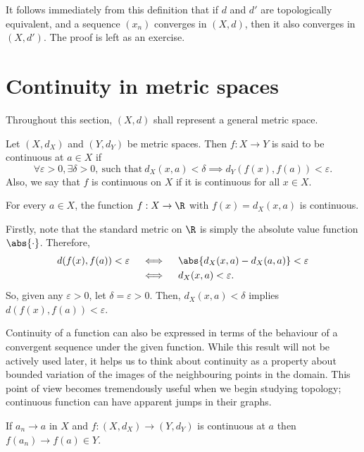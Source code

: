 \documentclass[draft]{penrose}
\begin{document}
It follows immediately from this definition that if $d$ and $d'$ are topologically equivalent, and a sequence $(x_n)$ converges in $(X, d)$, then it also converges in $(X, d')$. The proof is left as an exercise.

\section{Continuity in metric spaces}
Throughout this section, $(X,d)$ shall represent a general metric space.

\begin{ndfn}
  Let $(X, d_X)$ and $(Y, d_Y)$ be metric spaces. Then $f:X \to Y$ is said to be continuous at $a \in X$ if
  \begin{equation*}
    \forall \varepsilon>0, \exists \delta>0,\ \text{such that}\ d_{X}(x,a) < \delta \implies d_{Y}(f(x), f(a)) < \varepsilon.
  \end{equation*}
  Also, we say that $f$ is continuous on $X$ if it is continuous for all $x \in X$.
\end{ndfn}

\begin{negg}
  For every $a \in X$, the function $f:X \to \R$ with $f(x)=d_{X}(x,a)$ is continuous.

  Firstly, note that the standard metric on $\R$ is simply the absolute value function $\abs{\cdot}$. Therefore,
  \begin{align*}
    d(f(x), f(a)) < \varepsilon
    &\quad\iff\quad \abs{d_{X}(x,a) - d_{X}(a,a)} < \varepsilon\\
    &\quad\iff\quad d_{X}(x,a) < \varepsilon.
  \end{align*}
  So, given any $\varepsilon > 0$, let $\delta = \varepsilon > 0$. Then, $d_{X}(x,a) < \delta$ implies $d(f(x), f(a)) < \varepsilon$.
\end{negg}

Continuity of a function can also be expressed in terms of the behaviour of a convergent sequence under the given function. While this result will not be actively used later, it helps us to think about continuity as a property about bounded variation of the images of the neighbouring points in the domain. This point of view becomes tremendously useful when we begin studying topology; continuous function can have apparent jumps in their graphs.
\begin{nlemma}
  If $a_n \to a$ in $X$ and $f:(X, d_X) \to (Y, d_Y)$ is continuous at $a$ then $f(a_n) \to f(a) \in Y$.
\end{nlemma}
\end{document}
